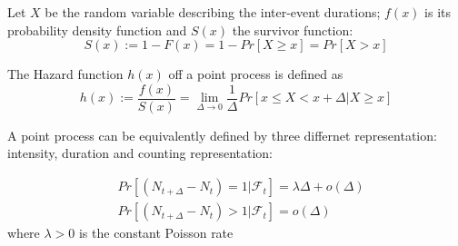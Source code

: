 \begin{mydefinition}
Let $X$ be the random variable describing the inter-event durations; $f(x)$ is its probability density function and $S(x)$ the survivor function:
\[
S(x) := 1 - F(x) = 1 - Pr[X \geq x] = Pr[X>x]
\]
\end{mydefinition}
\begin{mydefinition}
The Hazard function $h(x)$ off a point process is defined as
\[
h(x):= \frac{f(x)}{S(x)} = \lim_{\Delta \to 0} \frac{1}{\Delta}Pr[x\leq X < x + \Delta| X \geq x]
\]
\end{mydefinition}
A point process can be equivalently defined by three differnet representation: intensity, duration and counting representation:
\begin{mydefinition}
\begin{align*}
	& Pr[(N_{t + \Delta} -N_t)=1|\mathcal{F}_t]=\lambda \Delta + o(\Delta)\\
	& Pr[(N_{t + \Delta} -N_t)>1|\mathcal{F}_t]= o(\Delta)
\end{align*}
where $\lambda >0$ is the constant Poisson rate
\end{mydefinition}

